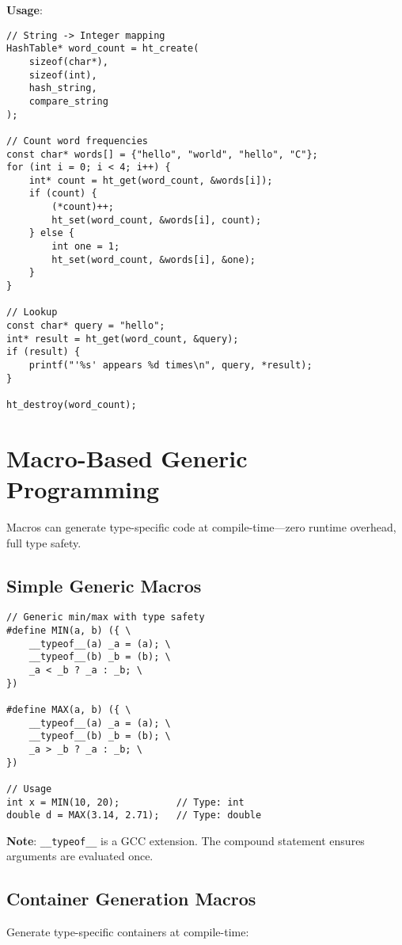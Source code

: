 \textbf{Usage}:

\begin{lstlisting}
// String -> Integer mapping
HashTable* word_count = ht_create(
    sizeof(char*),
    sizeof(int),
    hash_string,
    compare_string
);

// Count word frequencies
const char* words[] = {"hello", "world", "hello", "C"};
for (int i = 0; i < 4; i++) {
    int* count = ht_get(word_count, &words[i]);
    if (count) {
        (*count)++;
        ht_set(word_count, &words[i], count);
    } else {
        int one = 1;
        ht_set(word_count, &words[i], &one);
    }
}

// Lookup
const char* query = "hello";
int* result = ht_get(word_count, &query);
if (result) {
    printf("'%s' appears %d times\n", query, *result);
}

ht_destroy(word_count);
\end{lstlisting}

\section{Macro-Based Generic Programming}

Macros can generate type-specific code at compile-time---zero runtime overhead, full type safety.

\subsection{Simple Generic Macros}

\begin{lstlisting}
// Generic min/max with type safety
#define MIN(a, b) ({ \
    __typeof__(a) _a = (a); \
    __typeof__(b) _b = (b); \
    _a < _b ? _a : _b; \
})

#define MAX(a, b) ({ \
    __typeof__(a) _a = (a); \
    __typeof__(b) _b = (b); \
    _a > _b ? _a : _b; \
})

// Usage
int x = MIN(10, 20);          // Type: int
double d = MAX(3.14, 2.71);   // Type: double
\end{lstlisting}

\textbf{Note}: \texttt{\_\_typeof\_\_} is a GCC extension. The compound statement ensures arguments are evaluated once.

\subsection{Container Generation Macros}

Generate type-specific containers at compile-time:

